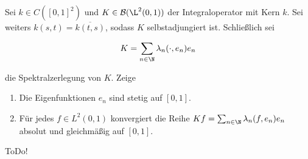 \begin{exercise}[37/1]

Sei $k \in C([0, 1]^2)$ und $K \in \mathcal{B}(\L^2(0, 1))$ der Integraloperator mit Kern $k$.
Sei weiters $k(s, t) = \overline{k(t, s)}$, sodass $K$ selbstadjungiert ist.
Schließlich sei

\begin{align*}
  K
  =
  \sum_{n \in \N}
  \lambda_n
  (\cdot, e_n)
  e_n
\end{align*}

die Spektralzerlegung von $K$.
Zeige

\begin{enumerate}[label = (\alph*)]

  \item
  Die Eigenfunktionen $e_n$ sind stetig auf $[0, 1]$.

  \item
  Für jedes $f \in L^2(0, 1)$ konvergiert die Reihe $K f = \sum_{n \in \N} \lambda_n (f, e_n) e_n$ absolut und gleichmäßig auf $[0, 1]$.

\end{enumerate}

\end{exercise}

\begin{solution}

ToDo!

\end{solution}
